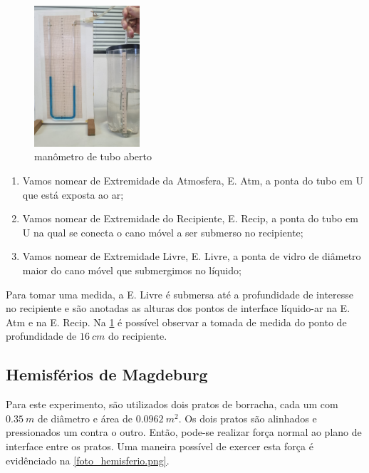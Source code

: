     \begin{figure}[H]
        \centering
        \includegraphics[width=0.35\textwidth]{fig/man_1.jpeg}
        \caption{manômetro de tubo aberto}
        \label{manometro}
    \end{figure}

    \begin{enumerate}
        \item Vamos nomear de Extremidade da Atmosfera, E. Atm, a ponta do tubo em U que está exposta ao ar;
        \item Vamos nomear de Extremidade do Recipiente, E. Recip, a ponta do tubo em U na qual se conecta o cano móvel a ser submerso no recipiente;
        \item Vamos nomear de Extremidade Livre, E. Livre, a ponta de vidro de diâmetro maior do cano móvel que submergimos no líquido;
    \end{enumerate}


    Para tomar uma medida, a E. Livre é submersa até a profundidade de interesse no recipiente e são anotadas as alturas dos pontos de interface líquido-ar na E. Atm e na E. Recip. Na \cref{manometro} é possível observar a tomada de medida do ponto de profundidade de \(\qty{16}{cm}\) do recipiente.

\subsection{Hemisférios de Magdeburg}

    Para este experimento, são utilizados dois pratos de borracha, cada um com \(\qty{0,35}{m}\) de diâmetro e área de \(\qty{0,0962}{m^2}\). Os dois pratos são alinhados e pressionados um contra o outro. Então, pode-se realizar força normal ao plano de interface entre os pratos. Uma maneira possível de exercer esta força é evidênciado na \cref{foto_hemisferio.png}.

